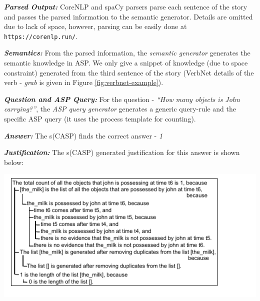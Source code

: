\documentclass[letterpaper]{article}
\begin{document}
\smallskip
\noindent \textit{\textbf{Parsed Output: }} CoreNLP and spaCy parsers parse each sentence of the story and passes the parsed information to the semantic generator. Details are omitted due to lack of space, however, parsing can be easily done at \texttt{https://corenlp.run/}.

\noindent \textit{\textbf{Semantics: }}
From the parsed information, the \textit{semantic generator} generates the semantic knowledge in ASP. We only give a snippet of knowledge (due to space constraint) generated from the third sentence of the story (VerbNet details of the verb - \textit{grab} is given in Figure \ref{fig:verbnet-example}).

\smallskip
\noindent
\cprotect {}

\smallskip

\noindent \textit{\textbf{Question and ASP Query: } }
For the question - \textit{``How many objects is John carrying?''}, the\textit{ ASP query generator} generates a generic query-rule and the specific ASP query (it uses the process template for counting).


\smallskip
\noindent
\cprotect {}

\smallskip
\noindent \textit{\textbf{Answer: }} The s(CASP) finds the correct answer - \textit{1}


\noindent \textit{\textbf{Justification: }}
The s(CASP) generated justification for this answer is shown below:

\smallskip

\noindent
\hbox {\hspace{-0.8em}\includegraphics [scale = 1.12]{justification.pdf}}
\end{document}
